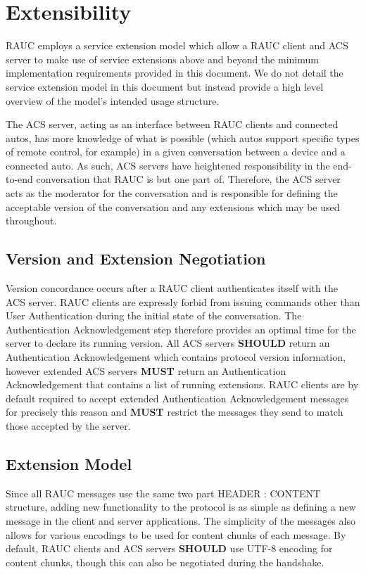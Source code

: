 \documentclass{article}
\begin{document}
\section{Extensibility}
\label{sec:ext}
RAUC employs a service extension model which allow a RAUC client and ACS server to make use of service extensions above and beyond the minimum implementation requirements provided in this document. We do not detail the service extension model in this document but instead provide a high level overview of the model's intended usage structure.

The ACS server, acting as an interface between RAUC clients and connected autos,  has more knowledge of what is possible (which autos support specific types of remote control, for example) in a given conversation between a device and a connected auto. As such, ACS servers have heightened responsibility in the end-to-end conversation that RAUC is but one part of. Therefore, the ACS server acts as the moderator for the conversation and is responsible for defining the acceptable version of the conversation and any extensions which may be used throughout.

\subsection{Version and Extension Negotiation}
Version concordance occurs after a RAUC client authenticates itself with the ACS server. RAUC clients are expressly forbid from issuing commands other than User Authentication during the initial state of the conversation. The Authentication Acknowledgement step therefore provides an optimal time for the server to declare its running version. All ACS servers \textbf{SHOULD} return an Authentication Acknowledgement which contains protocol version information, however extended ACS servers \textbf{MUST} return an Authentication Acknowledgement that contains a list of running extensions. RAUC clients are by default required to accept extended Authentication Acknowledgement messages for precisely this reason and \textbf{MUST} restrict the messages they send to match those accepted by the server.

\subsection{Extension Model}

Since all RAUC messages use the same two part HEADER : CONTENT structure, adding new functionality to the protocol is as simple as defining a new message in the client and server applications. The simplicity of the messages also allows for various encodings to be used for content chunks of each message. By default, RAUC clients and ACS servers \textbf{SHOULD} use UTF-8 encoding for content chunks, though this can also be negotiated during the handshake.
\end{document}
